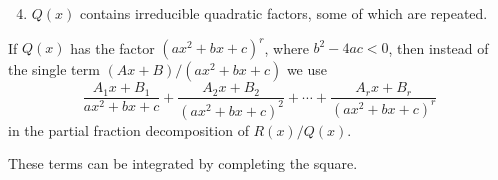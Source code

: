 \begin{frame}
\begin{enumerate}
\setcounter{enumi}{3}
\item  $Q(x)$ contains irreducible quadratic factors, some of which are repeated.
\end{enumerate}
If $Q(x)$ has the factor $(ax^2 + bx+c)^r$, where $b^2-4ac < 0$, then instead of the single term $(Ax+B)/(ax^2+bx+c)$ we use  
\[
\frac{A_1x+B_1}{ax^2+bx+c} + %
\frac{A_2x+B_2}{(ax^2+bx+c)^2} + %
 \cdots + %
\frac{A_rx+B_r}{(ax^2+bx+c)^r} %
\]
in the partial fraction decomposition of $R(x)/Q(x)$.

These terms can be integrated by completing the square.
\end{frame}
